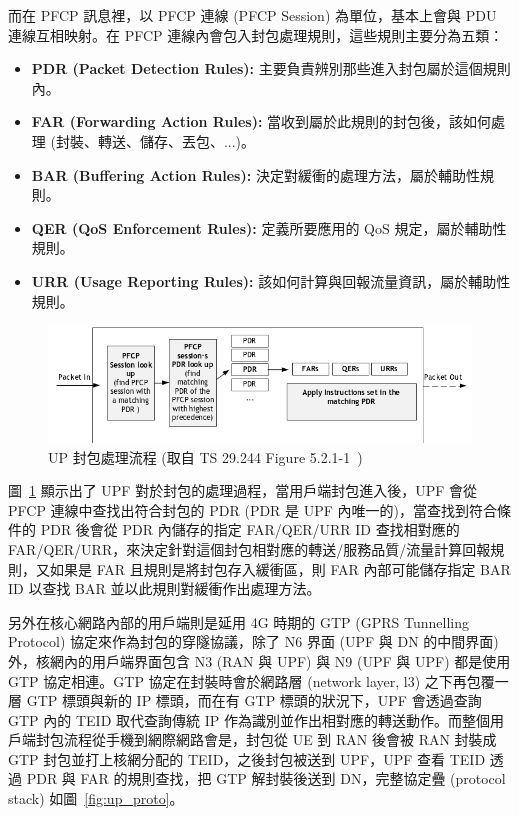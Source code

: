 而在 PFCP 訊息裡，以 PFCP 連線 (PFCP Session) 為單位，基本上會與 PDU 連線互相映射。在 PFCP 連線內會包入封包處理規則，這些規則主要分為五類：
\begin{itemize}
\item \textbf{PDR (Packet Detection Rules):} 主要負責辨別那些進入封包屬於這個規則內。
\item \textbf{FAR (Forwarding Action Rules):} 當收到屬於此規則的封包後，該如何處理 (封裝、轉送、儲存、丟包、...)。
\item \textbf{BAR (Buffering Action Rules):} 決定對緩衝的處理方法，屬於輔助性規則。
\item \textbf{QER (QoS Enforcement Rules):} 定義所要應用的 QoS 規定，屬於輔助性規則。
\item \textbf{URR (Usage Reporting Rules):} 該如何計算與回報流量資訊，屬於輔助性規則。
\end{itemize}

\begin{figure}[htbp]
    \centering
    \includegraphics[height=!,width=1\linewidth,keepaspectratio=true]{figures/29_244_5-2-1-1_pack_proc_flow}
    \caption[UP 封包處理流程]{{\footnotesize UP 封包處理流程 (取自 TS 29.244 Figure 5.2.1-1~\cite{3gpp.29.244})}}
    \label{fig:up_pack_proc_flow}
\end{figure}

圖~\ref{fig:up_pack_proc_flow} 顯示出了 UPF 對於封包的處理過程，當用戶端封包進入後，UPF 會從 PFCP 連線中查找出符合封包的 PDR (PDR 是 UPF 內唯一的)，當查找到符合條件的 PDR 後會從 PDR 內儲存的指定 FAR/QER/URR ID 查找相對應的 FAR/QER/URR，來決定針對這個封包相對應的轉送/服務品質/流量計算回報規則，又如果是 FAR 且規則是將封包存入緩衝區，則 FAR 內部可能儲存指定 BAR ID 以查找 BAR 並以此規則對緩衝作出處理方法。

另外在核心網路內部的用戶端則是延用 4G 時期的 GTP (GPRS Tunnelling Protocol) 協定來作為封包的穿隧協議，除了 N6 界面 (UPF 與 DN 的中間界面) 外，核網內的用戶端界面包含 N3 (RAN 與 UPF) 與 N9 (UPF 與 UPF) 都是使用 GTP 協定相連。GTP 協定在封裝時會於網路層 (network layer, l3) 之下再包覆一層 GTP 標頭與新的 IP 標頭，而在有 GTP 標頭的狀況下，UPF 會透過查詢 GTP 內的 TEID 取代查詢傳統 IP 作為識別並作出相對應的轉送動作。而整個用戶端封包流程從手機到網際網路會是，封包從 UE 到 RAN 後會被 RAN 封裝成 GTP 封包並打上核網分配的 TEID，之後封包被送到 UPF，UPF 查看 TEID 透過 PDR 與 FAR 的規則查找，把 GTP 解封裝後送到 DN，完整協定疊 (protocol stack) 如圖~\ref{fig:up_proto}。

